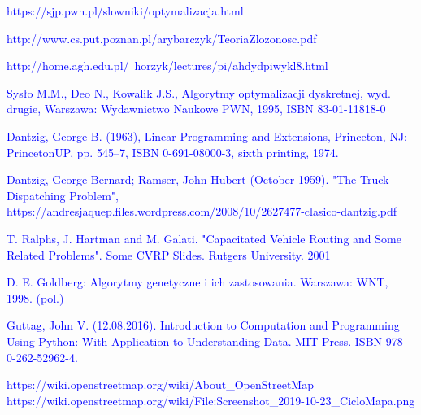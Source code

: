 \documentclass[a4paper, twoside, 12pt, justified]{article}
\begin{document}
	\newpage
	\renewcommand\refname{Źródła}
	\begin{thebibliography}{}
		{\hypertarget{optymalizacja}{\textcolor{blue}{
		https://sjp.pwn.pl/slowniki/optymalizacja.html}}}
	
		{\hypertarget{optymalizacja}{\textcolor{blue}{
		http://www.cs.put.poznan.pl/arybarczyk/TeoriaZlozonosc.pdf}}}
	
		{\hypertarget{zlozonosc}{\textcolor{blue}{
		http://home.agh.edu.pl/~horzyk/lectures/pi/ahdydpiwykl8.html}}}

		{\hypertarget{komiwojazer}{\textcolor{blue}{
		Sysło M.M., Deo N., Kowalik J.S., Algorytmy optymalizacji dyskretnej, wyd. drugie, Warszawa: Wydawnictwo Naukowe PWN, 1995, ISBN 83-01-11818-0}}}
	
		{\hypertarget{dfj}{\textcolor{blue}{
		Dantzig, George B. (1963), Linear Programming and Extensions, Princeton, NJ: PrincetonUP, pp. 545–7, ISBN 0-691-08000-3, sixth printing, 1974.}}}
	
		{\hypertarget{vrp}{\textcolor{blue}{
		 Dantzig, George Bernard; Ramser, John Hubert (October 1959). "The Truck Dispatching Problem", https://andresjaquep.files.wordpress.com/2008/10/2627477-clasico-dantzig.pdf}}}
		
		{\hypertarget{cvrp}{\textcolor{blue}{T. Ralphs, J. Hartman and M. Galati. "Capacitated Vehicle Routing and Some Related Problems". Some CVRP Slides. Rutgers University. 2001}}}
		
		{\hypertarget{ag}{\textcolor{blue}{
		D. E. Goldberg: Algorytmy genetyczne i ich zastosowania. Warszawa: WNT, 1998. (pol.)}}}
	
		{\hypertarget{python}{\textcolor{blue}{
		 Guttag, John V. (12.08.2016). Introduction to Computation and Programming Using Python: With Application to Understanding Data. MIT Press. ISBN 978-0-262-52962-4.}}}
	 
	 	{\hypertarget{osm}{\textcolor{blue}{
		https://wiki.openstreetmap.org/wiki/About\_OpenStreetMap}}}
		{\hypertarget{osm_example}{\textcolor{blue}{
		https://wiki.openstreetmap.org/wiki/File:Screenshot\_2019-10-23\_CicloMapa.png
		}}}

	\end{thebibliography}
	
	
	
\end{document}
